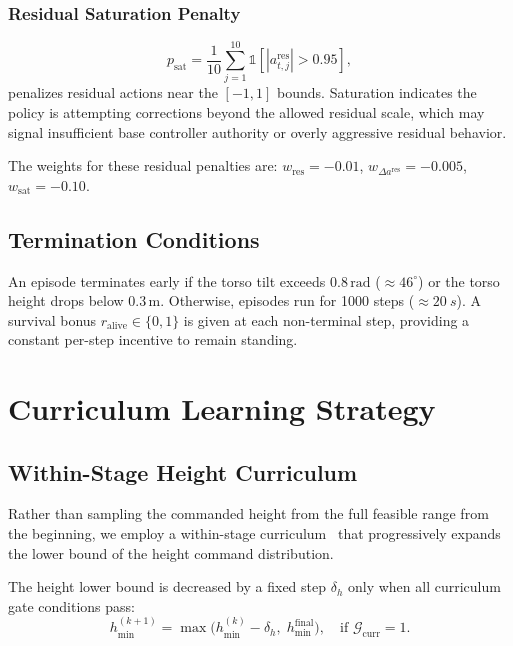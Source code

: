 \documentclass[conference]{IEEEtran}
\begin{document}
\subsubsection{Residual Saturation Penalty}
\begin{equation}
p_{\mathrm{sat}} = \frac{1}{10}\sum_{j=1}^{10} \mathbb{1}\!\left[
|a_{t,j}^{\mathrm{res}}| > 0.95
\right],
\end{equation}
penalizes residual actions near the $[-1, 1]$ bounds.
Saturation indicates the policy is attempting corrections beyond
the allowed residual scale, which may signal insufficient base
controller authority or overly aggressive residual behavior.

The weights for these residual penalties are:
$w_{\mathrm{res}} = -0.01$,
$w_{\Delta a^{\mathrm{res}}} = -0.005$,
$w_{\mathrm{sat}} = -0.10$.

\subsection{Termination Conditions}
An episode terminates early if the torso tilt exceeds $0.8\,\mathrm{rad}$
($\approx 46^\circ$) or the torso height drops below $0.3\,\mathrm{m}$.
Otherwise, episodes run for 1000 steps ($\approx\SI{20}{s}$).
A survival bonus $r_{\mathrm{alive}} \in \{0, 1\}$ is given at each
non-terminal step, providing a constant per-step incentive to remain standing.

\section{Curriculum Learning Strategy}
\label{sec:curriculum}

\subsection{Within-Stage Height Curriculum}
Rather than sampling the commanded height from the full feasible range
from the beginning, we employ a within-stage curriculum~\cite{bengio2009curriculum}
that progressively expands the lower bound of the height command distribution.

The height lower bound is decreased by a fixed step $\delta_h$ only when
all curriculum gate conditions pass:
\begin{equation}
h_{\min}^{(k+1)} = \max\!\big(h_{\min}^{(k)} - \delta_h,\;
h_{\min}^{\mathrm{final}}\big),
\quad
\text{if } \mathcal{G}_{\mathrm{curr}} = 1.
\label{eq:height_curriculum}
\end{equation}
\end{document}
